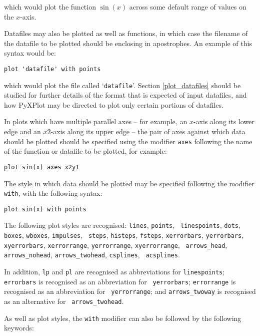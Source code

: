 \documentclass[a4paper,onecolumn,11pt]{book}
\begin{document}
\noindent which would plot the function $\sin(x)$ across some default range of
values on the $x$-axis.

Datafiles may also be plotted as well as functions, in which case the filename
of the datafile to be plotted should be enclosing in apostrophes. An example of
this syntax would be:

\begin{verbatim}
plot 'datafile' with points
\end{verbatim}

\noindent which would plot the file called `{\tt datafile}'.  Section
\ref{plot_datafiles} should be studied for further details of the format that is
expected of input datafiles, and how PyXPlot may be directed to plot only
certain portions of datafiles.

In plots which have multiple parallel axes -- for example, an $x$-axis along its
lower edge and an $x2$-axis along its upper edge -- the pair of axes against
which data should be plotted should be specified using the modifier {\tt axes}
following the name of the function or datafile to be plotted, for example:

\begin{verbatim}
plot sin(x) axes x2y1
\end{verbatim}

The style in which data should be plotted may be specified following the
modifier {\tt with}, with the following syntax:

\begin{verbatim}
plot sin(x) with points
\end{verbatim}

The following plot styles are recognised: {\tt lines}, {\tt points}, {\tt
linespoints}, {\tt dots}, {\tt boxes}, {\tt wboxes}, {\tt impulses}, {\tt
steps}, {\tt histeps}, {\tt fsteps}, {\tt xerrorbars}, {\tt yerrorbars}, {\tt
xyerrorbars}, {\tt xerrorrange}, {\tt yerrorrange}, {\tt xyerrorrange}, {\tt
arrows\_head}, {\tt arrows\_nohead}, {\tt arrows\_twohead}, {\tt csplines}, {\tt
acsplines}.

In addition, {\tt lp} and {\tt pl} are recognised as abbreviations
for {\tt linespoints}; {\tt errorbars} is recognised as an abbreviation for {\tt
yerrorbars}; {\tt errorrange} is recognised as an abbreviation for {\tt
yerrorrange}; and {\tt arrows\_twoway} is recognised as an alternative for {\tt
arrows\_twohead}.

As well as plot styles, the {\tt with} modifier can also be followed by the
following keywords:
\end{document}
